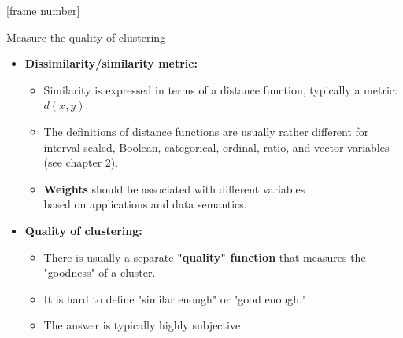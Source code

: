 \documentclass[aspectratio=169,t,xcolor=dvipsnames]{beamer}
\begin{document}
  {
    [frame number]
    \begin{frame}{Measure the quality of clustering}
        \begin{itemize}
          \item \textbf{Dissimilarity/similarity metric:}
          \begin{itemize}
            \item Similarity is expressed in terms of a distance function, typically a metric: $d(x,y)$.
            \item The definitions of distance functions are usually rather different for interval-scaled, Boolean, categorical, ordinal, ratio, and vector variables (see chapter 2).
            \item \textbf{\color{airforceblue}Weights} should be associated with different variables \\
                  based on applications and data semantics.
          \end{itemize}
          \item \textbf{Quality of clustering:}
          \begin{itemize}
            \item There is usually a separate \textbf{\color{airforceblue}"quality" function} that measures the "goodness" of a cluster.
            \item It is hard to define "similar enough" or "good enough."
            \item The answer is typically highly subjective.
          \end{itemize}
        \end{itemize}
    \end{frame}
  }
\end{document}
